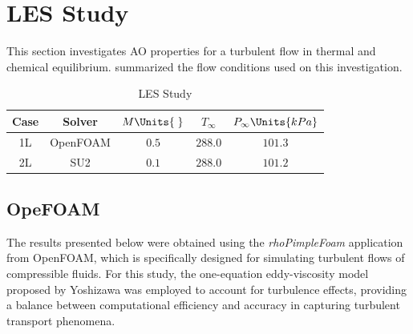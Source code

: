 \section{LES Study\label{ch4:lesStudy}}
This section investigates \gls{AO} properties for a turbulent flow in thermal
and chemical equilibrium.  summarized the flow conditions
used on this investigation. 
\begin{table}[H]
    \begin{center}
        \begin{tabular}{|c|c|c|c|c|}
            \hline
            Case & Solver & $M\Units{\;}$ & $T_{\infty}$ &
            $P_{\infty}\Units{kPa}$  \\ 
            \hline \hline
            1L & OpenFOAM & $0.5$ & $288.0$ & $101.3$ \\ \hline
            2L & SU2 & $0.1$ & $288.0$ & $101.2$ \\ \hline
        \end{tabular}
    \caption{LES Study \label{tab:lesStudy}}
    \end{center}
\end{table}

\subsection{OpeFOAM}
The results presented below were obtained using the \textit{rhoPimpleFoam}
application from \gls{OpenFOAM}, which is specifically designed for simulating
turbulent flows of compressible fluids. For this study, the one-equation
eddy-viscosity model proposed by Yoshizawa \cite{Yoshizawa1986} was employed to
account for turbulence effects, providing a balance between computational
efficiency and accuracy in capturing turbulent transport phenomena. \\

